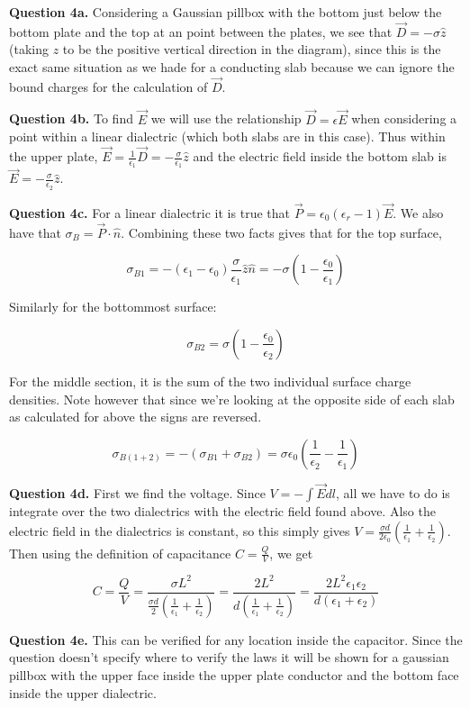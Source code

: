 \documentclass[letterpaper, reqno,11pt]{article}
\newcommand{\ep}{\epsilon}
\begin{document}
{\noindent\bf Question 4a.} Considering a Gaussian pillbox with the bottom just below the bottom plate and the top at an point between the plates, we see that $\vec D=-\sigma\hat z$ (taking $z$ to be the positive vertical direction in the diagram), since this is the exact same situation as we hade for a conducting slab because we can ignore the bound charges for the calculation of $\vec D$. 

{\noindent\bf Question 4b.} To find $\vec E$ we will use the relationship $\vec D=\epsilon\vec E$ when considering a point within a linear dialectric (which both slabs are in this case). Thus within the upper plate, $\vec E=\frac1{\epsilon_1}\vec D=-\frac{\sigma}{\epsilon_1}\hat z$ and the electric field inside the bottom slab is $\vec E=-\frac{\sigma}{\epsilon_2}\hat z$. 

{\noindent\bf Question 4c.} For a linear dialectric it is true that $\vec P=\epsilon_0(\epsilon_r - 1)\vec E$. We also have that $\sigma_B=\vec P\cdot\hat n$. Combining these two facts gives that for the top surface, 

\[
    \sigma_{B1}=-(\epsilon_1-\ep_0)\frac{\sigma}{\epsilon_1}\hat z\hat n=-\sigma(1-\frac{\ep_0}{\epsilon_1})
\]

Similarly for the bottommost surface: 

\[
    \sigma_{B2}=\sigma(1-\frac{\ep_0}{\epsilon_2})
\]

For the middle section, it is the sum of the two individual surface charge densities. Note however that since we're looking at the opposite side of each slab as calculated for above the signs are reversed. 

$$
    \sigma_{B(1+2)}=-(\sigma_{B1}+\sigma_{B2})=\sigma\ep_0(\frac1{\epsilon_2}-\frac1{\epsilon_1})
$$

{\noindent\bf Question 4d.} First we find the voltage. Since $V=-\int\vec E\dot dl$, all we have to do is integrate over the two dialectrics with the electric field found above. Also the electric field in the dialectrics is constant, so this simply gives $V=\frac{\sigma d}{2\epsilon_0}(\frac1{\epsilon_1}+\frac1{\epsilon_2})$. Then using the definition of capacitance $C=\frac{Q}{V}$, we get 

$$
    C=\frac QV=\frac{\sigma L^2}{\frac{\sigma d}{2}(\frac1{\epsilon_1}+\frac1{\epsilon_2})}=\frac{2L^2}{d(\frac1{\epsilon_1}+\frac1{\epsilon_2})}=\frac{2L^2\epsilon_1\epsilon_2}{d(\epsilon_1+\ep_2)}
$$

{\noindent\bf Question 4e.} This can be verified for any location inside the capacitor. Since the question doesn't specify where to verify the laws it will be shown for a gaussian pillbox with the upper face inside the upper plate conductor and the bottom face inside the upper dialectric. 
\end{document}
